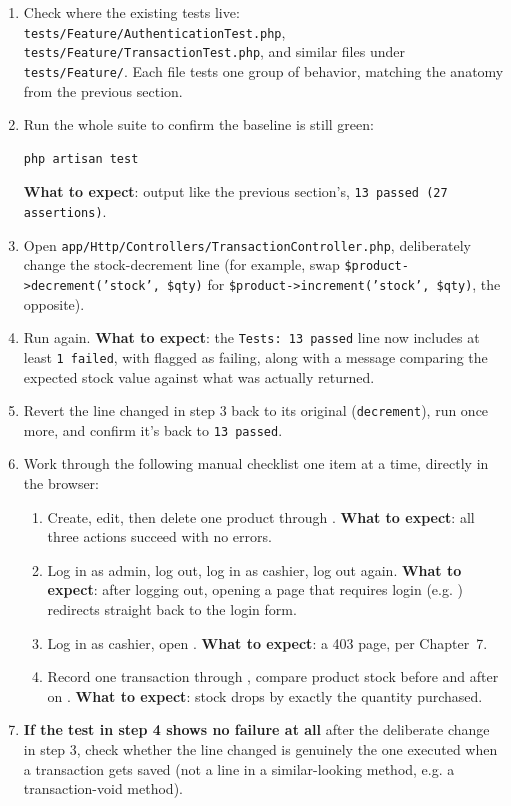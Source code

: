 \begin{enumerate}
  \item Check where the existing tests live:
    \texttt{tests/Feature\allowbreak/AuthenticationTest\allowbreak.php},
    \texttt{tests/Feature\allowbreak/TransactionTest\allowbreak.php}, and similar
    files under \texttt{tests/Feature/}. Each file tests one group of
    behavior, matching the anatomy from the previous section.
  \item Run the whole suite to confirm the baseline is still green:
    \begin{lstlisting}[language=bash]
php artisan test
    \end{lstlisting}
    \textbf{What to expect}: output like the previous section's,
    \texttt{13 passed (27 assertions)}.
  \item Open \texttt{app/Http/Controllers/TransactionController.php},
    deliberately change the stock-decrement line (for example, swap
    \texttt{\$product->decrement('stock', \$qty)} for
    \texttt{\$product->increment('stock', \$qty)}, the opposite).
  \item Run  again. \textbf{What to expect}:
    the \texttt{Tests: 13 passed} line now includes at least
    \texttt{1 failed}, with
     flagged as
    failing, along with a message comparing the expected stock value
    against what was actually returned.
  \item Revert the line changed in step 3 back to its original
    (\texttt{decrement}), run  once more, and
    confirm it's back to \texttt{13 passed}.
  \item Work through the following manual checklist one item at a
    time, directly in the browser:
    \begin{enumerate}
      \item Create, edit, then delete one product through
        . \textbf{What to expect}: all three actions
        succeed with no errors.
      \item Log in as admin, log out, log in as cashier, log out
        again. \textbf{What to expect}: after logging out, opening a
        page that requires login (e.g. ) redirects
        straight back to the login form.
      \item Log in as cashier, open . \textbf{What to
        expect}: a 403 page, per Chapter~7.
      \item Record one transaction through , compare
        product stock before and after on .
        \textbf{What to expect}: stock drops by exactly the quantity
        purchased.
    \end{enumerate}
  \item \textbf{If the test in step 4 shows no failure at all} after
    the deliberate change in step 3, check whether the line changed is
    genuinely the one executed when a transaction gets saved (not a
    line in a similar-looking method, e.g. a transaction-void method).
\end{enumerate}

